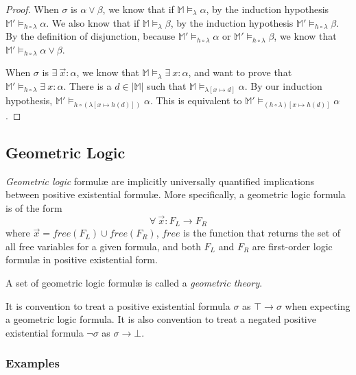 \begin{proof}
			When $\sigma$ is $\alpha \vee \beta$, we know that if $\mathbb{M}
			\models_\lambda \alpha$, by the induction hypothesis $\mathbb{M}'
			\models_{h\circ\lambda} \alpha$. We also know that if $\mathbb{M}
			\models_\lambda \beta$, by the induction hypothesis $\mathbb{M}'
			\models_{h\circ\lambda} \beta$. By the definition of disjunction,
			because $\mathbb{M}' \models_{h\circ\lambda} \alpha$ or
			$\mathbb{M}' \models_{h\circ\lambda} \beta$, we know that
			$\mathbb{M}' \models_{h\circ\lambda} \alpha \vee \beta$.

			When $\sigma$ is $\exists\ \vec x : \alpha$, we know that
			$\mathbb{M} \models_\lambda \exists\ x : \alpha$, and want to prove
			that $\mathbb{M}' \models_{h\circ\lambda} \exists\ x : \alpha$.
			There is a $d \in |\mathbb{M}|$ such that $\mathbb{M}
			\models_{\lambda[x\mapsto d]} \alpha$.  By our induction
			hypothesis, $\mathbb{M}' \models_{h\circ(\lambda[x\mapsto h(d)])}
			\alpha$. This is equivalent to $\mathbb{M}'
			\models_{(h\circ\lambda)[x\mapsto h(d)]} \alpha$.

		\end{proof}

	\subsection{Geometric Logic}
	\label{sec:technical_background.geometric_logic}

		\emph{Geometric logic} formul{\ae} are implicitly universally
		quantified implications between positive existential formul{\ae}. More
		specifically, a geometric logic formula is of the form
			\[
			\forall\ \vec{x} : F_L \to F_R
			\]
		where $\vec{x} = free(F_L) \cup free(F_R)$, $free$ is the function that
		returns the set of all free variables for a given formula, and both
		$F_L$ and $F_R$ are first-order logic formul{\ae} in positive
		existential form.

		A set of geometric logic formul{\ae} is called a \emph{geometric
		theory}.

		It is convention to treat a positive existential formula $\sigma$ as
		$\top \to \sigma$ when expecting a geometric logic formula. It is also
		convention to treat a negated positive existential formula $\neg\sigma$
		as $\sigma \to \bot$.


		\subsubsection{Examples}

